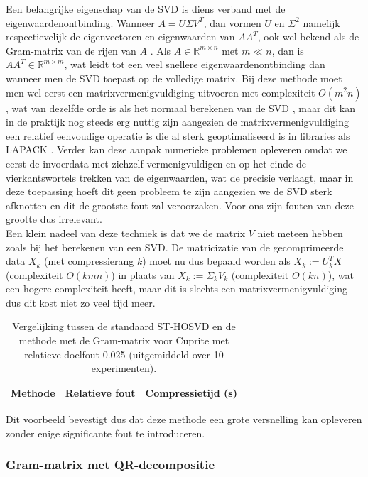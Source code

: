Een belangrijke eigenschap van de SVD is diens verband met de eigenwaardenontbinding. Wanneer $A = U \Sigma V^T$, dan vormen $U$ en $\Sigma^2$ namelijk respectievelijk de eigenvectoren en eigenwaarden van $A A^T$, ook wel bekend als de Gram-matrix van de rijen van $A$ \cite{ref:svd}. Als $A \in \mathbb{R}^{m \times n}$ met $m \ll n$, dan is $A A^T \in \mathbb{R}^{m \times m}$, wat leidt tot een veel snellere eigenwaardenontbinding dan wanneer men de SVD toepast op de volledige matrix. Bij deze methode moet men wel eerst een matrixvermenigvuldiging uitvoeren met complexiteit $O(m^2 n)$, wat van dezelfde orde is als het normaal berekenen van de SVD \cite{ref:svd}, maar dit kan in de praktijk nog steeds erg nuttig zijn aangezien de matrixvermenigvuldiging een relatief eenvoudige operatie is die al sterk geoptimaliseerd is in libraries als LAPACK \cite{ref:lapack}. Verder kan deze aanpak numerieke problemen opleveren omdat we eerst de invoerdata met zichzelf vermenigvuldigen en op het einde de vierkantswortels trekken van de eigenwaarden, wat de precisie verlaagt, maar in deze toepassing hoeft dit geen probleem te zijn aangezien we de SVD sterk afknotten en dit de grootste fout zal veroorzaken. Voor ons zijn fouten van deze grootte dus irrelevant.\\

Een klein nadeel van deze techniek is dat we de matrix $V$ niet meteen hebben zoals bij het berekenen van een SVD. De matricizatie van de gecomprimeerde data $X_k$ (met compressierang $k$) moet nu dus bepaald worden als $X_k := U_k^T X$ (complexiteit $O(kmn)$) in plaats van $X_k := \Sigma_k V_k$ (complexiteit $O(kn)$), wat een hogere complexiteit heeft, maar dit is slechts een matrixvermenigvuldiging dus dit kost niet zo veel tijd meer.\\

\begin{table}[H]
\centering
\begin{tabular}{|l|l|l|}
\hline
Methode & Relatieve fout & Compressietijd (s)\\ \hline

\end{tabular}
\caption{Vergelijking tussen de standaard ST-HOSVD en de methode met de Gram-matrix voor Cuprite met relatieve doelfout 0.025 (uitgemiddeld over 10 experimenten).}
\end{table}
Dit voorbeeld bevestigt dus dat deze methode een grote versnelling kan opleveren zonder enige significante fout te introduceren.

\subsubsection{Gram-matrix met QR-decompositie}

